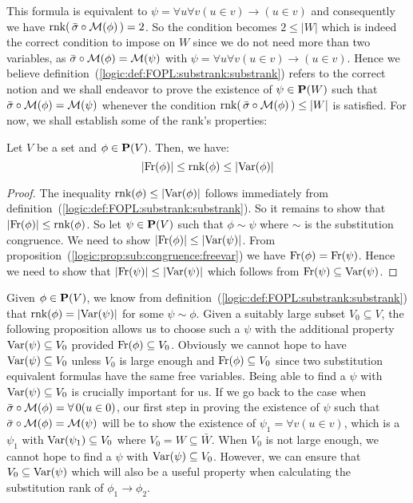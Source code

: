 This formula is equivalent to $\psi=\forall u\forall v(u\in
v)\to(u\in v)$ and consequently we have
$\mbox{\rm rnk}(\,\bar{\sigma}\circ{\cal M}(\phi)\,)=2$. So the condition
becomes $2\leq|W|$ which is indeed the correct condition to impose
on $W$ since we do not need more than two variables, as
$\bar{\sigma}\circ{\cal M}(\phi)={\cal M}(\psi)$ with $\psi=\forall
u\forall v(u\in v)\to(u\in v)$. Hence we believe
definition~(\ref{logic:def:FOPL:substrank:substrank}) refers to the
correct notion and we shall endeavor to prove the existence of
$\psi\in{\bf P}(W)$ such that $\bar{\sigma}\circ{\cal M}(\phi)={\cal
M}(\psi)$ whenever the condition $\mbox{\rm rnk}(\,\bar{\sigma}\circ{\cal
M}(\phi)\,)\leq|W|$ is satisfied. For now, we shall establish some
of the rank's properties:
\begin{prop}\label{logic:prop:FOPL:substrank:basic:ineq}
Let $V$ be a set and $\phi\in\mbox{${\bf P}(V)$}$. Then, we have:
    \[
    |\mbox{\rm Fr}(\phi)|\leq\mbox{\rm rnk}(\phi)\leq|\mbox{\rm Var}(\phi)|
    \]
\end{prop}
\begin{proof}
The inequality $\mbox{\rm rnk}(\phi)\leq|\mbox{\rm Var}(\phi)|$ follows immediately from
definition~(\ref{logic:def:FOPL:substrank:substrank}). So it remains
to show that $|\mbox{\rm Fr}(\phi)|\leq\mbox{\rm rnk}(\phi)$. So let $\psi\in\mbox{${\bf P}(V)$}$ such
that $\phi\sim\psi$ where $\sim$ is the substitution congruence. We
need to show $|\mbox{\rm Fr}(\phi)|\leq|\mbox{\rm Var}(\psi)|$. From
proposition~(\ref{logic:prop:sub:congruence:freevar}) we have
$\mbox{\rm Fr}(\phi)=\mbox{\rm Fr}(\psi)$. Hence we need to show that
$|\mbox{\rm Fr}(\psi)|\leq|\mbox{\rm Var}(\psi)|$ which follows from
$\mbox{\rm Fr}(\psi)\subseteq\mbox{\rm Var}(\psi)$.
\end{proof}

Given $\phi\in\mbox{${\bf P}(V)$}$, we know from
definition~(\ref{logic:def:FOPL:substrank:substrank}) that
$\mbox{\rm rnk}(\phi)=|\mbox{\rm Var}(\psi)|$ for some $\psi\sim\phi$. Given a suitably
large subset $V_{0}\subseteq V$, the following proposition allows us
to choose such a $\psi$ with the additional property
$\mbox{\rm Var}(\psi)\subseteq V_{0}$ provided $\mbox{\rm Fr}(\phi)\subseteq V_{0}$.
Obviously we cannot hope to have $\mbox{\rm Var}(\psi)\subseteq V_{0}$ unless
$V_{0}$ is large enough and $\mbox{\rm Fr}(\phi)\subseteq V_{0}$ since two
substitution equivalent formulas have the same free variables. Being
able to find a $\psi$ with $\mbox{\rm Var}(\psi)\subseteq V_{0}$ is crucially
important for us. If we go back to the case when
$\bar{\sigma}\circ{\cal M}(\phi)=\forall\,0(u\in 0)$, our first step
in proving the existence of $\psi$ such that $\bar{\sigma}\circ{\cal
M}(\phi)={\cal M}(\psi)$ will be to show the existence of
$\psi_{1}=\forall v(u\in v)$, which is a $\psi_{1}$ with
$\mbox{\rm Var}(\psi_{1})\subseteq V_{0}$ where $V_{0}=W\subseteq\bar{W}$.
When $V_{0}$ is not large enough, we cannot hope to find  a $\psi$
with $\mbox{\rm Var}(\psi)\subseteq V_{0}$. However, we can ensure that
$V_{0}\subseteq\mbox{\rm Var}(\psi)$ which will also be a useful property when
calculating the substitution rank of $\phi_{1}\to\phi_{2}$.


